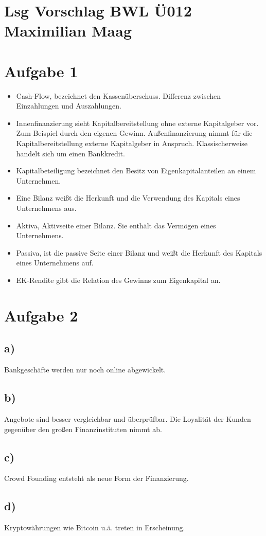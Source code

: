 \documentclass{article}
\begin{document}
	\section*{Lsg Vorschlag BWL Ü012 Maximilian Maag}
	\section*{Aufgabe 1}
	\begin{itemize}
		\item Cash-Flow, bezeichnet den Kassenüberschuss. Differenz zwischen Einzahlungen und Auszahlungen.
		\item Innenfinanzierung sieht Kapitalbereitstellung ohne externe Kapitalgeber vor. Zum Beispiel durch den eigenen Gewinn. Außenfinanzierung nimmt für die Kapitalbereitstellung externe Kapitalgeber in Anspruch. Klassischerweise handelt sich um einen Bankkredit.
		\item Kapitalbeteiligung bezeichnet den Besitz von Eigenkapitalanteilen an einem Unternehmen.
		\item Eine Bilanz weißt die Herkunft und die Verwendung des Kapitals eines Unternehmens aus.
		\item Aktiva, Aktivseite einer Bilanz. Sie enthält das Vermögen eines Unternehmens.
		\item Passiva, ist die passive Seite einer Bilanz und weißt die Herkunft des Kapitals eines Unternehmens auf.
		\item EK-Rendite gibt die Relation des Gewinns zum Eigenkapital an. 
	\end{itemize}
	\section*{Aufgabe 2}
	\subsection*{a)}
	Bankgeschäfte werden nur noch online abgewickelt.
	\subsection*{b)}
	Angebote sind besser vergleichbar und überprüfbar. Die Loyalität der Kunden gegenüber den großen Finanzinstituten nimmt ab.
	\subsection*{c)}
	Crowd Founding entsteht als neue Form der Finanzierung.
	\subsection*{d)}
	Kryptowährungen wie Bitcoin u.ä. treten in Erscheinung.
\end{document}
